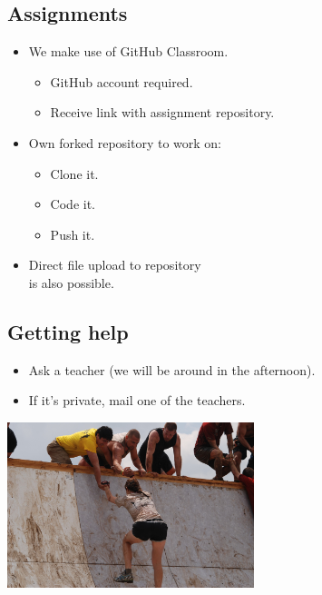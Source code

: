 \documentclass[aspectratio=1610,slidestop]{beamer}
\begin{document}
\subsection{Assignments}
\begin{pframe}
 \begin{itemize}
  \item We make use of GitHub Classroom.
  \begin{itemize}
   \item GitHub account required.
   \item Receive link with assignment repository.
  \end{itemize}
  \item Own forked repository to work on:
  \begin{itemize}
   \item Clone it.
   \item Code it.
   \item Push it.
  \end{itemize}
  \item Direct file upload to repository\\
  is also possible.
 \end{itemize}
\end{pframe}


\subsection{Getting help}
\begin{pframe}
 \begin{itemize}
  \item Ask a teacher (we will be around in the afternoon).
  \item If it's private, mail one of the teachers.
 \end{itemize}
 \begin{center}
  \includegraphics[width=0.54\textwidth]{../../images/help.jpg}
 \end{center}
\end{pframe}
\end{document}
